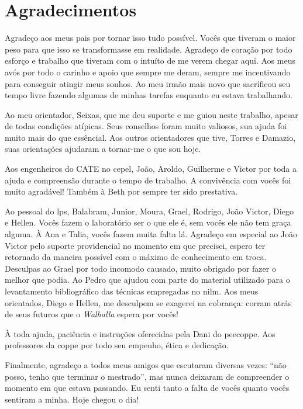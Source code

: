 \chapter*{Agradecimentos}

Agradeço aos meus pais por tornar isso tudo possível. Vocês que
tiveram o maior peso para que isso se transformasse em realidade.
Agradeço de coração por todo esforço e trabalho que tiveram com o
intuíto de me verem chegar aqui. Aos meus avós por todo o carinho e
apoio que sempre me deram, sempre me incentivando para conseguir
atingir meus sonhos. Ao meu irmão mais novo que sacríficou seu tempo
livre fazendo algumas de minhas tarefas enquanto eu estava
trabalhando.

Ao meu orientador, Seixas, que me deu suporte e me guiou neste
trabalho, apesar de todas condições atípicas. Seus conselhos foram
muito valiosos, sua ajuda foi muito mais do que essêncial. Aos outros
orientadores que tive, Torres e Damazio, suas orientações ajudaram a
tornar-me o que sou hoje.

Aos engenheiros do CATE no \acl{cepel}, João, Aroldo, Guilherme e
Victor por toda a ajuda e compreensão durante o tempo de trabalho. A
convivência com vocês foi muito agradável! Também à Beth por sempre
ter sido prestativa.

Ao pessoal do \acs{lps}, Balabram, Junior, Moura, Grael, Rodrigo, João
Victor, Diego e Hellen. Vocês fazem o laboratório ser o que ele é, sem
vocês ele não tem graça alguma. À Ana e Talia, vocês fazem muita falta
lá. Agradeço em especial ao João Victor pelo suporte providencial no
momento em que precisei, espero ter retornado da maneira possível com
o máximo de conhecimento em troca. Desculpas ao Grael por todo
incomodo causado, muito obrigado por fazer o melhor que podia. Ao
Pedro que ajudou com parte do material utilizado para o
levantamento bibliográfico das técnicas empregadas no \acs{nilm}.
Aos meus orientados, Diego e Hellen, me desculpem se exagerei na
cobrança: corram atrás de seus futuros que o \emph{Walhalla} espera
por vocês!

À toda ajuda, paciência e instruções oferecidas pela Dani do
\acs{peecoppe}. Aos professores da \acs{coppe} por todo seu
empenho, ética e dedicação.

Finalmente, agradeço a todos meus amigos que escutaram diversas vezes:
``não posso, tenho que terminar o mestrado'', mas nunca deixaram de
compreender o momento em que estava passando. Eu senti tanto a falta
de vocês quanto vocês sentiram a minha. Hoje chegou o dia!

